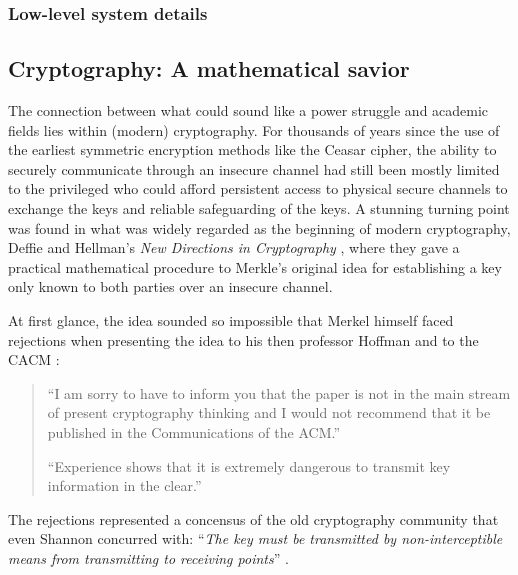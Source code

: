 \documentclass{article}
\begin{document}
\subsubsection{Low-level system details}

\subsection{Cryptography: A mathematical savior} \label{sec.crypto}
The connection between what could sound like a power struggle and academic
fields lies within (modern) cryptography. For thousands of years since the use
of the earliest symmetric encryption methods like the Ceasar cipher, the
ability to securely communicate through an insecure channel had still been
mostly limited to the privileged who could afford persistent access to physical
secure channels to exchange the keys and reliable safeguarding of the keys.
A stunning turning point was found in what was widely regarded as the beginning
of modern cryptography, Deffie and Hellman's \emph{New Directions in
Cryptography} \cite{new.directions.crypto}, where they gave a practical
mathematical procedure to Merkle's original idea for establishing a key only
known to both parties over an insecure channel.

At first glance, the idea sounded so impossible that Merkel himself faced 
rejections when presenting the idea to his then professor Hoffman and to the
CACM \cite{merkle.rejection}:
\begin{quotation}
	``I am sorry to have to inform you that the paper is not in the main stream
	of present cryptography thinking and I would not recommend that it be
	published in the Communications of the ACM.''

	``Experience shows that it is extremely dangerous to transmit key
	information in the clear.''\cite{merkle.rejection}
\end{quotation}
The rejections represented a concensus of the old cryptography community that
even Shannon concurred with: ``\emph{The key must be transmitted by
non-interceptible means from transmitting to receiving points}''
\cite[p.~670]{shannon.theory.secrecy}.
\end{document}

